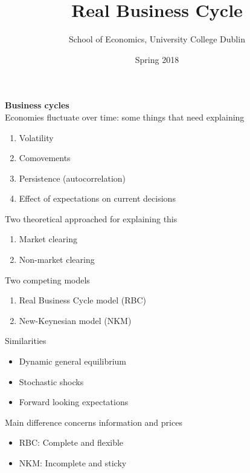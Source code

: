 \documentclass{beamer}
\title{Real Business Cycle}
\author{School of Economics, University College Dublin}
\date{Spring 2018}
\begin{document}
\begin{frame}
 \titlepage
\end{frame}

\begin{frame}
  \textbf{Business cycles}\\
  Economies fluctuate over time: some things that need explaining
  \begin{enumerate}
    \item Volatility
    \item Comovements
    \item Persistence (autocorrelation)
    \item Effect of expectations on current decisions
  \end{enumerate}
  \medskip
  Two theoretical approached for explaining this
  \begin{enumerate}
    \item Market clearing
    \item Non-market clearing
  \end{enumerate}
\end{frame}

\begin{frame}
  Two competing models
  \begin{enumerate}
    \item Real Business Cycle model (RBC)
    \item New-Keynesian model (NKM)
  \end{enumerate}
  \medskip
  Similarities
  \begin{itemize}
    \item Dynamic general equilibrium
    \item Stochastic shocks
    \item Forward looking expectations
  \end{itemize}
  \medskip
  Main difference concerns information and prices
  \begin{itemize}
    \item RBC: Complete and flexible 
    \item NKM: Incomplete and sticky
  \end{itemize}
\end{frame}
\end{document}
